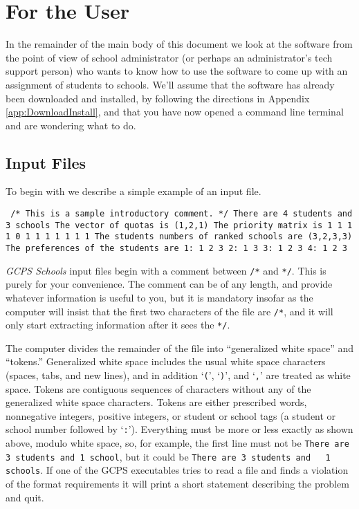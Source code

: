 \documentclass[12pt]{article}
\theoremstyle{definition}
\begin{document}
\section{For the User}

In the remainder of the main body of this document we look at the
software from the point of view of school administrator (or perhaps an
administrator's tech support person) who wants to know how to use the
software to come up with an assignment of students to schools.  We'll
assume that the software has already been downloaded and installed, by
following the directions in Appendix \ref{app:DownloadInstall}, and
that you have now opened a command line terminal and are wondering
what to do.

\subsection{Input Files}

To begin with we describe a simple example of an input file.

\begin{obeylines}\texttt{
/* This is a sample introductory comment. */
There are 4 students and 3 schools
The vector of quotas is (1,2,1)
The priority matrix is
     1     1     1
     1     0     1
     1     1     1
     1     1     1
The students numbers of ranked schools are (3,2,3,3)
The preferences of the students are
1:  1  2  3  
2:  1  3  
3:  1  2  3  
4:  1  2  3  
  }
\end{obeylines}

\medskip

\emph{GCPS Schools} input files begin with a comment between
\texttt{/*} and \texttt{*/}.  This is purely for your convenience.
The comment can be of any length, and provide whatever information is
useful to you, but it is mandatory insofar as the computer will insist
that the first two characters of the file are \texttt{/*}, and it will
only start extracting information after it sees the \texttt{*/}.

The computer divides the remainder of the file into ``generalized
white space'' and ``tokens.''  Generalized white space includes the
usual white space characters (spaces, tabs, and new lines), and in
addition `\texttt{(}', `\texttt{)}', and `\texttt{,}' are treated as
white space.  Tokens are contiguous sequences of characters without
any of the generalized white space characters.  Tokens are either
prescribed words, nonnegative integers, positive integers, or student
or school tags (a student or school number followed by `\texttt{:}').
Everything must be more or less exactly as shown above, modulo white
space, so, for example, the first line must not be \texttt{There are 3
  students and 1 school}, but it could be \texttt{There are 3 students
  and \ \ 1 schools}.  If one of the GCPS executables tries to read a
file and finds a violation of the format requirements it will print a
short statement describing the problem and quit.
\end{document}
